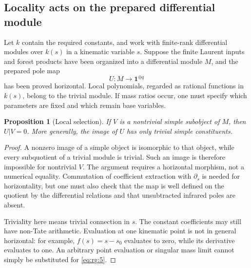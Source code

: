 \documentclass[11pt,a4paper,oneside]{article}
\theoremstyle{plain}
\newtheorem{proposition}[theorem]{Proposition}
\theoremstyle{definition}
\theoremstyle{remark}
\numberwithin{equation}{section}
\begin{document}
\subsection{Locality acts on the prepared differential module}\label{sec:rg:3}
Let $k$ contain the required constants, and work with finite-rank differential modules over $k(s)$ in a kinematic variable $s$. Suppose the finite Laurent inputs and forest products have been organized into a differential module $M$, and the prepared pole map
\begin{equation}
U:M\longrightarrow\mathbf1^{\oplus q}             \label{eq:rg:5}
\end{equation}
has been proved horizontal. Local polynomials, regarded as rational functions in $k(s)$, belong to the trivial module. If mass ratios occur, one must specify which parameters are fixed and which remain base variables.

\begin{proposition}[Local selection]\label{thm:rg:3.1}
If $V$ is a nontrivial simple subobject of $M$, then $U|V=0$. More generally, the image of $U$ has only trivial simple constituents.
\end{proposition}
\begin{proof}
A nonzero image of a simple object is isomorphic to that object, while every subquotient of a trivial module is trivial. Such an image is therefore impossible for nontrivial $V$. The argument requires a horizontal morphism, not a numerical equality. Commutation of coefficient extraction with $\partial_s$ is needed for horizontality, but one must also check that the map is well defined on the quotient by the differential relations and that unsubtracted infrared poles are absent.

Triviality here means trivial connection in $s$. The constant coefficients may still have non-Tate arithmetic. Evaluation at one kinematic point is not in general horizontal: for example, $f(s)=s-s_0$ evaluates to zero, while its derivative evaluates to one. An arbitrary point evaluation or singular mass limit cannot simply be substituted for \eqref{eq:rg:5}.
\end{proof}
\end{document}
